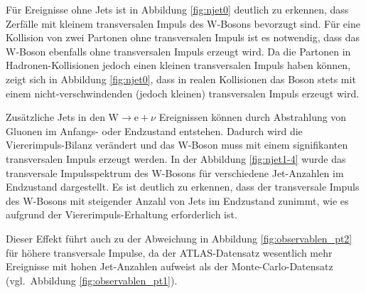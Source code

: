 \documentclass[11pt, a4paper]{article}
\numberwithin{equation}{section}
\begin{document}
Für Ereignisse ohne Jets ist in Abbildung \ref{fig:njet0} deutlich zu erkennen, dass Zerfälle mit kleinem transversalen Impuls des W-Bosons bevorzugt sind.
Für eine Kollision von zwei Partonen ohne transversalen Impuls ist es notwendig, dass das W-Boson ebenfalls ohne transversalen Impuls erzeugt wird.
Da die Partonen in Hadronen-Kollisionen jedoch einen kleinen transversalen Impuls haben können, zeigt sich in Abbildung \ref{fig:njet0}, dass in realen Kollisionen das Boson stets mit einem nicht-ver\-schwin\-den\-den (jedoch kleinen) transversalen Impuls erzeugt wird.

Zusätzliche Jets in den $\mathrm{W} \rightarrow \mathrm{e} + \nu$ Ereignissen können durch Abstrahlung von Gluonen im Anfangs- oder Endzustand entstehen.
Dadurch wird die Viererimpuls-Bilanz verändert und das W-Boson muss mit einem signifikanten transversalen Impuls erzeugt werden.
In der Abbildung \ref{fig:njet1-4} wurde das transversale Impulsspektrum des W-Bosons für verschiedene Jet-Anzahlen im Endzustand dargestellt.
Es ist deutlich zu erkennen, dass der transversale Impuls des W-Bosons mit steigender Anzahl von Jets im Endzustand zunimmt, wie es aufgrund der Viererimpuls-Erhaltung erforderlich ist.

Dieser Effekt führt auch zu der Abweichung in Abbildung \ref{fig:observablen_pt2} für höhere transversale Impulse, da der ATLAS-Datensatz wesentlich mehr Ereignisse mit hohen Jet-Anzahlen aufweist als der Monte-Carlo-Datensatz (vgl.\ Abbildung \ref{fig:observablen_pt1}).


\clearpage
\end{document}
